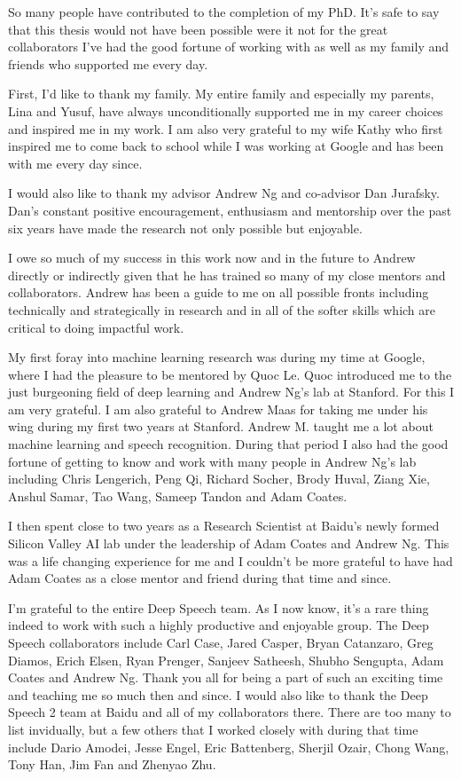 
So many people have contributed to the completion of my PhD. It's safe to say
that this thesis would not have been possible were it not for the great
collaborators I've had the good fortune of working with as well as my family
and friends who supported me every day.

First, I'd like to thank my family. My entire family and especially my parents,
Lina and Yusuf, have always unconditionally supported me in my career choices
and inspired me in my work. I am also very grateful to my wife Kathy who first
inspired me to come back to school while I was working at Google and has been
with me every day since.

I would also like to thank my advisor Andrew Ng and co-advisor Dan Jurafsky.
Dan's constant positive encouragement, enthusiasm and mentorship over the past
six years have made the research not only possible but enjoyable.

I owe so much of my success in this work now and in the future to Andrew
directly or indirectly given that he has trained so many of my close mentors
and collaborators. Andrew has been a guide to me on all possible fronts
including technically and strategically in research and in all of the softer
skills which are critical to doing impactful work.

My first foray into machine learning research was during my time at Google,
where I had the pleasure to be mentored by Quoc Le. Quoc introduced me to the
just burgeoning field of deep learning and Andrew Ng's lab at Stanford. For
this I am very grateful. I am also grateful to Andrew Maas for taking me under
his wing during my first two years at Stanford. Andrew M. taught me a lot about
machine learning and speech recognition. During that period I also had the good
fortune of getting to know and work with many people in Andrew Ng's lab
including Chris Lengerich, Peng Qi, Richard Socher, Brody Huval, Ziang Xie,
Anshul Samar, Tao Wang, Sameep Tandon and Adam Coates.

I then spent close to two years as a Research Scientist at Baidu's newly formed
Silicon Valley AI lab under the leadership of Adam Coates and Andrew Ng. This
was a life changing experience for me and I couldn't be more grateful to have
had Adam Coates as a close mentor and friend during that time and since.

I'm grateful to the entire Deep Speech team. As I now know, it's a rare thing
indeed to work with such a highly productive and enjoyable group. The Deep
Speech collaborators include Carl Case, Jared Casper, Bryan Catanzaro, Greg
Diamos, Erich Elsen, Ryan Prenger, Sanjeev Satheesh, Shubho Sengupta, Adam
Coates and Andrew Ng. Thank you all for being a part of such an exciting time
and teaching me so much then and since. I would also like to thank the Deep
Speech 2 team at Baidu and all of my collaborators there. There are too many to
list invidually, but a few others that I worked closely with during that time
include Dario Amodei, Jesse Engel, Eric Battenberg, Sherjil Ozair, Chong Wang,
Tony Han, Jim Fan and Zhenyao Zhu.

